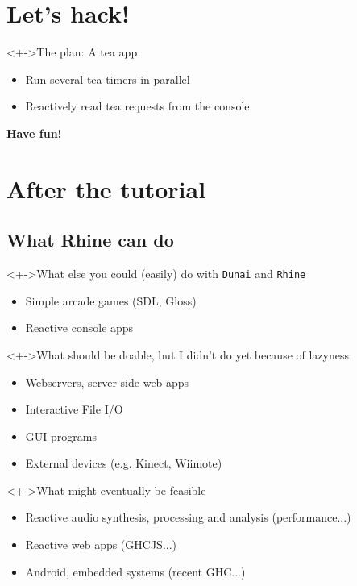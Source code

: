 \documentclass{enigtex-beamer-base}
\begin{document}
\section{Let's hack!}

\begin{frame}
\begin{block}<+->{The plan: A tea app}
	\begin{itemize}
		\item Run several tea timers in parallel
		\item Reactively read tea requests from the console
	\end{itemize}
\end{block}
\end{frame}

\begin{frame}
\textbf{Have fun!}
\end{frame}

\section{After the tutorial}

\subsection{What Rhine can do}

\begin{frame}
	\begin{block}<+->{What else you could (easily) do with \texttt{Dunai} and \texttt{Rhine}}
		\begin{itemize}
			\item Simple arcade games (SDL, Gloss)
			\item Reactive console apps
		\end{itemize}
	\end{block}
	\begin{block}<+->{What should be doable, but I didn't do yet because of lazyness}
		\begin{itemize}
			\item Webservers, server-side web apps
			\item Interactive File I/O
			\item GUI programs
			\item External devices (e.g. Kinect, Wiimote)
		\end{itemize}
	\end{block}
	\begin{block}<+->{What might eventually be feasible}
		\begin{itemize}
			\item Reactive audio synthesis, processing and analysis (performance...)
			\item Reactive web apps (GHCJS...)
			\item Android, embedded systems (recent GHC...)
		\end{itemize}
	\end{block}
\end{frame}
\end{document}
